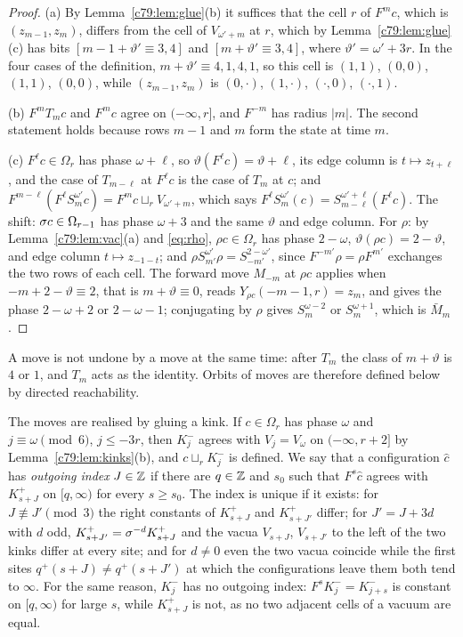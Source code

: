 \begin{proof}
(a) By Lemma~\ref{c79:lem:glue}(b) it suffices that the cell $r$ of $F^mc$, which is $(z_{m-1},z_m)$, differs from the cell of $V_{\omega'+m}$ at $r$, which by Lemma~\ref{c79:lem:glue}(c) has bits $[m-1+\vartheta'\equiv3,4]$ and $[m+\vartheta'\equiv3,4]$, where $\vartheta'=\omega'+3r$. In the four cases of the definition, $m+\vartheta'\equiv4,1,4,1$, so this cell is $(1,1)$, $(0,0)$, $(1,1)$, $(0,0)$, while $(z_{m-1},z_m)$ is $(0,\cdot)$, $(1,\cdot)$, $(\cdot,0)$, $(\cdot,1)$.

(b) $F^mT_mc$ and $F^mc$ agree on $(-\infty,r]$, and $F^{-m}$ has radius $|m|$. The second statement holds because rows $m-1$ and $m$ form the state at time $m$.

(c) $F^\ell c\in\Omega_r$ has phase $\omega+\ell$, so $\vartheta(F^\ell c)=\vartheta+\ell$, its edge column is $t\mapsto z_{t+\ell}$, and the case of $T_{m-\ell}$ at $F^\ell c$ is the case of $T_m$ at $c$; and $F^{m-\ell}(F^\ell S^{\omega'}_mc)=F^mc\sqcup_rV_{\omega'+m}$, which says $F^\ell S^{\omega'}_m(c)=S^{\omega'+\ell}_{m-\ell}(F^\ell c)$. The shift: $\sigma c\in\Omega_{r-1}$ has phase $\omega+3$ and the same $\vartheta$ and edge column. For $\rho$: by Lemma~\ref{c79:lem:vac}(a) and \eqref{eq:rho}, $\rho c\in\Omega_r$ has phase $2-\omega$, $\vartheta(\rho c)=2-\vartheta$, and edge column $t\mapsto z_{-1-t}$; and $\rho S^{\omega'}_{m'}\rho=S^{2-\omega'}_{-m'}$, since $F^{-m'}\rho=\rho F^{m'}$ exchanges the two rows of each cell. The forward move $M_{-m}$ at $\rho c$ applies when $-m+2-\vartheta\equiv2$, that is $m+\vartheta\equiv0$, reads $Y_{\rho c}(-m-1,r)=z_m$, and gives the phase $2-\omega+2$ or $2-\omega-1$; conjugating by $\rho$ gives $S_m^{\omega-2}$ or $S_m^{\omega+1}$, which is $\bar M_m$.
\end{proof}

A move is not undone by a move at the same time: after $T_m$ the class of $m+\vartheta$ is $4$ or $1$, and $T_m$ acts as the identity. Orbits of moves are therefore defined below by directed reachability.

The moves are realised by gluing a kink. If $c\in\Omega_r$ has phase $\omega$ and $j\equiv\omega\pmod 6$, $j\le-3r$, then $K^-_j$ agrees with $V_j=V_\omega$ on $(-\infty,r+2]$ by Lemma~\ref{c79:lem:kinks}(b), and $c\sqcup_rK^-_j$ is defined. We say that a configuration $\hat c$ has \emph{outgoing index} $J\in\mathbb{Z}$ if there are $q\in\mathbb{Z}$ and $s_0$ such that $F^s{\hat c}$ agrees with $K^+_{s+J}$ on $[q,\infty)$ for every $s\ge s_0$. The index is unique if it exists: for $J\not\equiv J'\pmod 3$ the right constants of $K^+_{s+J}$ and $K^+_{s+J'}$ differ; for $J'=J+3d$ with $d$ odd, $K^+_{s+J'}=\sigma^{-d}K^+_{s+J}$ and the vacua $V_{s+J}$, $V_{s+J'}$ to the left of the two kinks differ at every site; and for $d\ne0$ even the two vacua coincide while the first sites $q^+(s+J)\ne q^+(s+J')$ at which the configurations leave them both tend to $\infty$. For the same reason, $K^-_j$ has no outgoing index: $F^sK^-_j=K^-_{j+s}$ is constant on $[q,\infty)$ for large $s$, while $K^+_{s+J}$ is not, as no two adjacent cells of a vacuum are equal.

